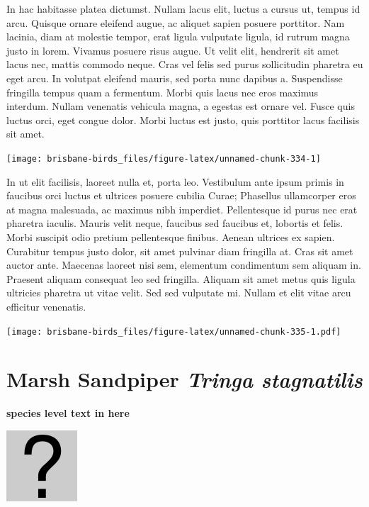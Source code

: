 \documentclass[]{book}
\let\origfigure\figure
\let\endorigfigure\endfigure
\renewenvironment{figure}[1][2] {
  \expandafter\origfigure\expandafter[H]
} {
  \endorigfigure
}
\begin{document}
In hac habitasse platea dictumst. Nullam lacus elit, luctus a cursus ut,
tempus id arcu. Quisque ornare eleifend augue, ac aliquet sapien posuere
porttitor. Nam lacinia, diam at molestie tempor, erat ligula vulputate
ligula, id rutrum magna justo in lorem. Vivamus posuere risus augue. Ut
velit elit, hendrerit sit amet lacus nec, mattis commodo neque. Cras vel
felis sed purus sollicitudin pharetra eu eget arcu. In volutpat eleifend
mauris, sed porta nunc dapibus a. Suspendisse fringilla tempus quam a
fermentum. Morbi quis lacus nec eros maximus interdum. Nullam venenatis
vehicula magna, a egestas est ornare vel. Fusce quis luctus orci, eget
congue dolor. Morbi luctus est justo, quis porttitor lacus facilisis sit
amet.

\begin{figure}
\texttt{[image: brisbane-birds\_files/figure-latex/unnamed-chunk-334-1]} \caption{insert figure caption}\label{fig:unnamed-chunk-334}
\end{figure}

In ut elit facilisis, laoreet nulla et, porta leo. Vestibulum ante ipsum
primis in faucibus orci luctus et ultrices posuere cubilia Curae;
Phasellus ullamcorper eros at magna malesuada, ac maximus nibh
imperdiet. Pellentesque id purus nec erat pharetra iaculis. Mauris velit
neque, faucibus sed faucibus et, lobortis et felis. Morbi suscipit odio
pretium pellentesque finibus. Aenean ultrices ex sapien. Curabitur
tempus justo dolor, sit amet pulvinar diam fringilla at. Cras sit amet
auctor ante. Maecenas laoreet nisi sem, elementum condimentum sem
aliquam in. Praesent aliquam consequat leo sed fringilla. Aliquam sit
amet metus quis ligula ultricies pharetra ut vitae velit. Sed sed
vulputate mi. Nullam et elit vitae arcu efficitur venenatis.

\begin{figure}
\centering
\texttt{[image: brisbane-birds\_files/figure-latex/unnamed-chunk-335-1.pdf]}
\caption{\label{fig:unnamed-chunk-335}insert figure caption}
\end{figure}

\section{\texorpdfstring{Marsh Sandpiper \emph{Tringa
stagnatilis}}{Marsh Sandpiper Tringa stagnatilis}}\label{marsh-sandpiper-tringa-stagnatilis}

\textbf{species level text in here}

\begin{figure}
\centering
\includegraphics{assets/missing.png}
\caption{No image for species}
\end{figure}
\end{document}
